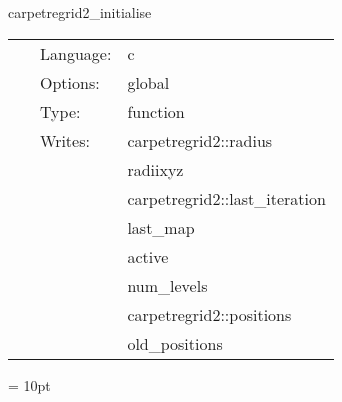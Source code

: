 \hspace{5mm} carpetregrid2\_initialise 

\hspace{5mm}{\it initialise locations of refined regions } 


\hspace{5mm}

 \begin{tabular*}{160mm}{cll} 
~ & Language:  & c \\ 
~ & Options:  & global \\ 
~ & Type:  & function \\ 
~ & Writes:  & carpetregrid2::radius \\ 
~& ~ &radiixyz\\ 
~& ~ &carpetregrid2::last\_iteration\\ 
~& ~ &last\_map\\ 
~& ~ &active\\ 
~& ~ &num\_levels\\ 
~& ~ &carpetregrid2::positions\\ 
~& ~ &old\_positions\\ 
\end{tabular*} 



\vspace{5mm}\parskip = 10pt 

